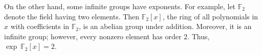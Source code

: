 \documentclass[12pt]{article}
\begin{document}
On the other hand, some infinite groups have exponents.  For example, let $\mathbb{F}_2$ denote the field having two elements.  Then $\mathbb{F}_2[x]$, the ring of all polynomials in $x$ with coefficients in $\mathbb{F}_2$, is an abelian group under addition.  Moreover, it is an infinite group; however, every nonzero element has order $2$.  Thus, $\operatorname{exp}~\mathbb{F}_2[x]=2$.
\end{document}
